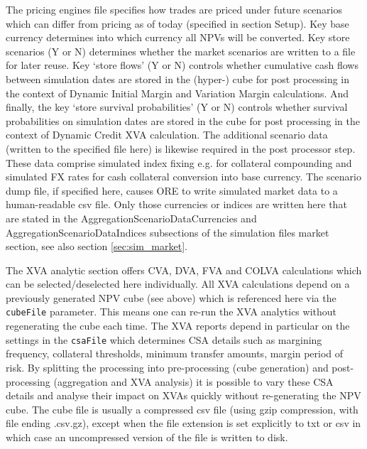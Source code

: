 \documentclass[12pt, a4paper]{article}
\begin{document}
The pricing engines file specifies how trades are priced under future scenarios which can differ from pricing as of
today (specified in section Setup).  Key base currency determines into which currency all NPVs will be converted. Key
store scenarios (Y or N) determines whether the market scenarios are written to a file for later reuse. Key
`store flows' (Y or N) controls whether cumulative cash flows between simulation dates are stored in the (hyper-)
cube for post processing in the context of Dynamic Initial Margin and Variation Margin calculations. And finally, the
key `store survival probabilities' (Y or N) controls whether survival probabilities on simulation dates are stored in the
cube for post processing in the context of Dynamic Credit XVA calculation. The additional
scenario data (written to the specified file here) is likewise required in the post processor step. These data comprise
simulated index fixing e.g. for collateral compounding and simulated FX rates for cash collateral conversion into base
currency. The scenario dump file, if specified here, causes ORE to write simulated market data to a human-readable csv
file. Only those currencies or indices are written here that are stated in the AggregationScenarioDataCurrencies and 
AggregationScenarioDataIndices subsections of the simulation files market section, see also section
\ref{sec:sim_market}.
 
\medskip The XVA analytic section offers CVA, DVA, FVA and COLVA calculations which can be selected/deselected here
individually. All XVA calculations depend on a previously generated NPV cube (see above) which is referenced here via
the {\tt cubeFile} parameter. This means one can re-run the XVA analytics without regenerating the cube each time. The
XVA reports depend in particular on the settings in the {\tt csaFile} which determines CSA details such as margining
frequency, collateral thresholds, minimum transfer amounts, margin period of risk. By splitting the processing into
pre-processing (cube generation) and post-processing (aggregation and XVA analysis) it is possible to vary these CSA
details and analyse their impact on XVAs quickly without re-generating the NPV cube. The cube file is usually a
compressed csv file (using gzip compression, with file ending .csv.gz), except when the file extension is set explicitly
to txt or csv in which case an uncompressed version of the file is written to disk.
\end{document}
